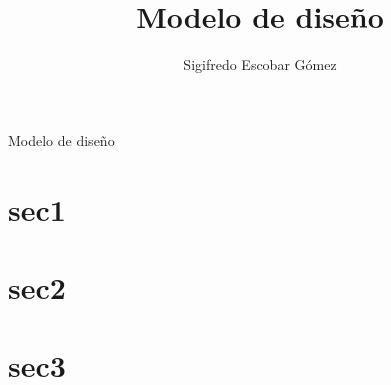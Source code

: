 \documentclass[a4paper,10pt]{article}
\title{Modelo de diseño}
\author{Sigifredo Escobar Gómez}
\date{}
\begin{document}
\maketitle Modelo de diseño

\tableofcontents	%

\newpage

\section{sec1}


\section{sec2}


\section{sec3}
\end{document}
